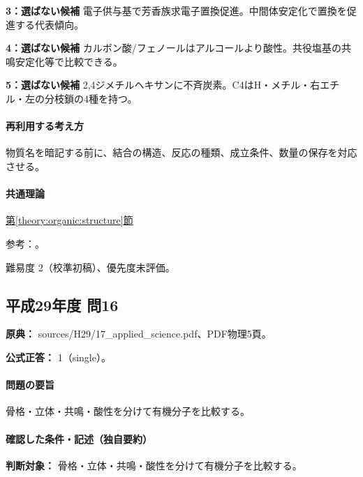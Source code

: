 \noindent\textbf{3：選ばない候補} 電子供与基で芳香族求電子置換促進。中間体安定化で置換を促進する代表傾向。\par

\noindent\textbf{4：選ばない候補} カルボン酸/フェノールはアルコールより酸性。共役塩基の共鳴安定化等で比較できる。\par

\noindent\textbf{5：選ばない候補} 2,4ジメチルヘキサンに不斉炭素。C4はH・メチル・右エチル・左の分枝鎖の4種を持つ。\par

\paragraph{再利用する考え方} 物質名を暗記する前に、結合の構造、反応の種類、成立条件、数量の保存を対応させる。

\paragraph{共通理論} \hyperref[theory:organic:structure]{第\ref*{theory:organic:structure}節}

\par 参考：\cite{organic_chirality,organic_directing}。

\par 難易度 2（校準初稿）、優先度未評価。

\subsection{平成29年度 問16}
\label{q:h29-reg-applied-16}

\noindent\textbf{原典：} sources/H29/17\_applied\_science.pdf、PDF物理5頁。

\textbf{公式正答：} 1（single）。

\paragraph{問題の要旨} 骨格・立体・共鳴・酸性を分けて有機分子を比較する。

\paragraph{確認した条件・記述（独自要約）}\mbox{}\par

\noindent\textbf{判断対象：} 骨格・立体・共鳴・酸性を分けて有機分子を比較する。\par

